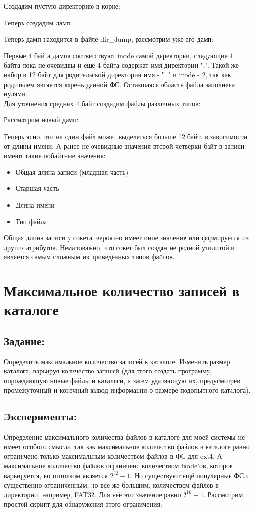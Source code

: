 \documentclass[a4paper]{article}
\begin{document}
\noindent Создадим пустую директорию в корне:

Теперь создадим дамп:

Теперь дамп находится в файле dir\_dump, рассмотрим уже его дамп:

Первые 4 байта дампа соответствуют inode самой директории, следующие 4 байта пока не очевидны и ещё 4 байта содержат имя директории ".". Такой же набор в 12 байт для родительской директории имя - ".." и inode - 2, так как родителем является корень данной ФС. Оставшаяся область файла заполнена нулями.\\
Для уточнения средних 4 байт создадим файлы различных типов:

Рассмотрим новый дамп:

Теперь ясно, что на один файл может выделяться больше 12 байт, в зависимости от длины имени. А ранее не очевидные значения второй четвёрки байт в записи имеют такие побайтные значения:
\begin{itemize}
\item Общая длина записи (младшая часть)
\item Старшая часть
\item Длина имени
\item Тип файла
\end{itemize}
Общая длина записи у сокета, вероятно имеет иное значение или формируется из других атрибутов. Немаловажно, что сокет был создан не родной утилитой и является самым сложным из приведённых типов файлов.

\section{Максимальное количество записей в каталоге}
\subsection{Задание:} Определить максимальное количество записей в каталоге. 
Изменить размер каталога, варьируя количество записей (для этого создать программу, порождающую новые файлы и каталоги, а затем удаляющую их, предусмотрев промежуточный и конечный вывод информации о размере подопытного каталога). 

\subsection{Эксперименты:}
Определение максимального количества файлов в каталоге для моей системы не имеет особого смысла, так как максимальное количество файлов в каталоге равно ограничено только максимальным количеством файлов в ФС для ext4. А максимальное количество файлов ограничено количеством inode'ов, которое варьируется, но потолком является $2^{32}-1$. Но существуют ещё популярные ФС с существенно ограниченным, но всё же большим, количеством файлов в директории, например, FAT32. Для неё это значение равно $2^{16}-1$. Рассмотрим простой скрипт для обнаружения этого ограничения:
\end{document}
